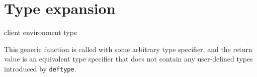 
\chapter{Type expansion}

 {client environment type}

This generic function is called with some arbitrary type specifier,
and the return value is an equivalent type specifier that does not
contain any user-defined types introduced by \texttt{deftype}.
